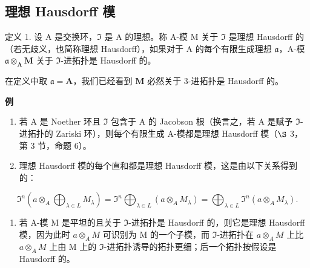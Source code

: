 \subsection{理想 Hausdorff 模}

定义 1. 设 A 是交换环，\(\mathfrak{I}\) 是 A 的理想。称 A-模 M 关于 \(\mathfrak{I}\) 是理想 Hausdorff 的（若无歧义，也简称理想 Hausdorff），如果对于 A 的每个有限生成理想 \(\mathfrak{a}\)，A-模 \(\mathfrak{a} \otimes_{\mathbf{A}} \mathbf{M}\) 关于 \(\mathfrak{I}\)-进拓扑是 Hausdorff 的。

在定义中取 \(\mathfrak{a} = \mathbf{A}\)，我们已经看到 \(\mathbf{M}\) 必然关于 3-进拓扑是 Hausdorff 的。

\textbf{例}\par

\begin{enumerate}
\def\labelenumi{(\arabic{enumi})}
\item
  若 A 是 Noether 环且 \(\mathfrak{I}\) 包含于 A 的 Jacobson 根（换言之，若 A 是赋予 \(\mathfrak{I}\)-进拓扑的 Zariski 环），则每个有限生成 A-模都是理想 Hausdorff 模（\(\S\) 3，第 3 节，命题 6）。
\item
  理想 Hausdorff 模的每个直和都是理想 Hausdorff 模，这是由以下关系得到的：
\end{enumerate}

\[
\Im^ {n} \left(a \otimes_ {A} \bigoplus_ {\lambda \in L} M _ {\lambda}\right) = \Im^ {n} \bigoplus_ {\lambda \in L} (a \otimes_ {A} M _ {\lambda}) = \bigoplus_ {\lambda \in L} \Im^ {n} (a \otimes_ {A} M _ {\lambda}).
\]

\begin{enumerate}
\def\labelenumi{(\arabic{enumi})}
\setcounter{enumi}{2}
\tightlist
\item
  若 A-模 M 是平坦的且关于 \(\Im\)-进拓扑是 Hausdorff 的，则它是理想 Hausdorff 模，因为此时 \(a \otimes_{A} M\) 可识别为 M 的一个子模，而 \(\Im\)-进拓扑在 \(a \otimes_{A} M\) 上比 \(a \otimes_{A} M\) 上由 M 上的 \(\Im\)-进拓扑诱导的拓扑更细；后一个拓扑按假设是 Hausdorff 的。
\end{enumerate}


